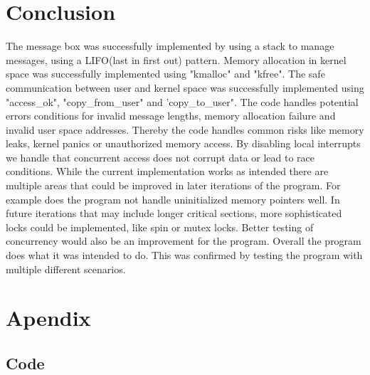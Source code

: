 \documentclass[12pt,a4paper]{report}
\begin{document}
\section{Conclusion}
The message box was successfully implemented by using a stack to manage messages, using a LIFO(last in first out) pattern. Memory allocation in kernel space was successfully implemented using "kmalloc" and "kfree". The safe communication between user and kernel space was successfully implemented using "access\_ok", "copy\_from\_user" and 'copy\_to\_user". The code handles potential errors conditions for invalid message lengths, memory allocation failure and invalid user space addresses. Thereby the code handles common risks like memory leaks, kernel panics or unauthorized memory access. By disabling local interrupts we handle that concurrent access does not corrupt data or lead to race conditions.
While the current implementation works as intended there are multiple areas that could be improved in later iterations of the program. For example does the program not handle uninitialized memory pointers well. In future iterations that may include longer critical sections, more sophisticated locks could be implemented, like spin or mutex locks. Better testing of concurrency would also be an improvement for the program.
Overall the program does what it was intended to do. This was confirmed by testing the program with multiple different scenarios.


\section{Apendix}

\subsection{Code}
\end{document}
